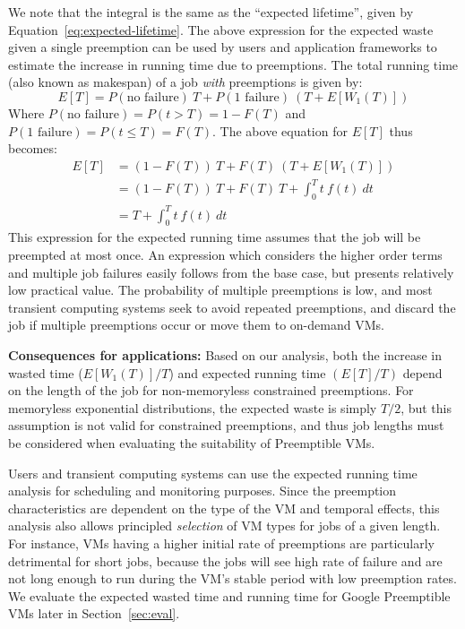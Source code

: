 We note that the integral is the same as the ``expected lifetime'', given by Equation~\ref{eq:expected-lifetime}.
%
The above expression for the expected waste given a single preemption can be used by users and application frameworks to estimate the increase in running time due to preemptions. %
The total running time (also known as makespan) of a job \emph{with} preemptions is given by:
\begin{equation}
  \label{eq:tot-run-time}
  E[T] = P(\text{no failure})~T + P(\text{1 failure})~(T + E[W_1(T)])
\end{equation}
Where $P(\text{no failure}) = P(t > T) =  1- F(T)$ and $P(\text{1 failure}) = P(t \leq T) = F(T)$.
The above equation for $E[T]$ thus becomes: 
%
\begin{align}
  \label{eq:tot-run-time-2}
  E[T] &= (1-F(T))~T + F(T)~(T + E[W_1(T)]) \\ \nonumber
  &= (1-F(T))~T + F(T)~T + \int_0^{T} t~f(t)~dt \\ \nonumber
       &= T + \int_0^{T} t~f(t)~dt         
\end{align}
This expression for the expected running time assumes that the job will be preempted at most once.
An expression which considers the higher order terms and multiple job failures easily follows from the base case, but presents relatively low practical value. 
The probability of multiple preemptions is low, and most transient computing systems seek to avoid repeated preemptions, and discard the job if multiple preemptions occur or move them to on-demand VMs. 


\noindent \textbf{Consequences for applications:}
Based on our analysis, both the increase in wasted time ($E[W_1(T)]/T$) and expected running time $(E[T]/T)$ depend on the length of the job for non-memoryless constrained preemptions. 
For memoryless exponential distributions, the expected waste is simply $T/2$, but this assumption is not valid for constrained preemptions, and thus job lengths must be considered when evaluating the suitability of Preemptible VMs. 


Users and transient computing systems can use the expected running time analysis for scheduling and monitoring purposes.
Since the preemption characteristics are dependent on the type of the VM and temporal effects, this analysis also allows principled \emph{selection} of VM types for jobs of a given length. 
For instance, VMs having a higher initial rate of preemptions are particularly detrimental for short jobs, because the jobs will see high rate of failure and are not long enough to run during the VM's stable period with low  preemption rates. 
We evaluate the expected wasted time and running time for Google Preemptible VMs later in Section~\ref{sec:eval}. 

